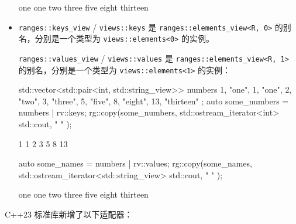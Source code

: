 \begin{itemize}
\begin{shell}
one one two three five eight thirteen
\end{shell}

\item
\verb|ranges::keys_view| / \verb|views::keys| 是 \verb|ranges::elements_view<R, 0>| 的别名，分别是一个类型为 \verb|views::elements<0>| 的实例。

\verb|ranges::values_view| / \verb|views::values| 是 \verb|ranges::elements_view<R, 1>| 的别名，分别是一个类型为 \verb|views::elements<1>| 的实例：

\begin{cpp}
std::vector<std::pair<int, std::string_view>> numbers{
    {1, "one"},
    {1, "one"},
    {2, "two"},
    {3, "three"},
    {5, "five"},
    {8, "eight"},
    {13, "thirteen"} };
auto some_numbers = numbers | rv::keys;
rg::copy(some_numbers, std::ostream_iterator<int>{ std::cout, " " });
\end{cpp}

\begin{shell}
1 1 2 3 5 8 13
\end{shell}

\begin{cpp}
auto some_names = numbers | rv::values;
rg::copy(some_names,
         std::ostream_iterator<std::string_view>{ std::cout, " " });
\end{cpp}

\begin{shell}
one one two three five eight thirteen
\end{shell}
\end{itemize}

C++23 标准库新增了以下适配器：

